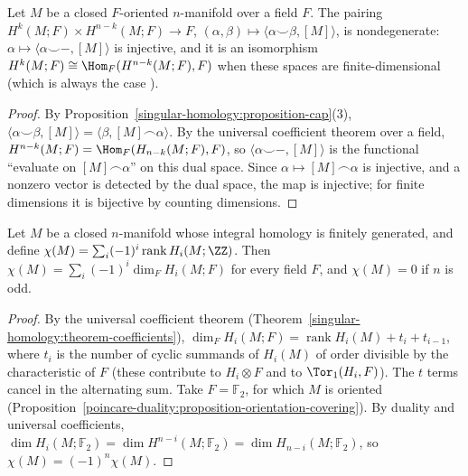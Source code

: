 \begin{corollary}\label{poincare-duality:corollary-cup-pairing}
Let $M$ be a closed $F$-oriented $n$-manifold over a field $F$. The pairing $H^k(M; F) \times H^{n-k}(M; F) \to F$, $(\alpha, \beta) \mapsto \langle \alpha \smile \beta, [M] \rangle$,
is nondegenerate: $\alpha \mapsto \langle \alpha \smile -, [M] \rangle$ is injective, and it is an isomorphism $H^k(M; F) \cong \Hom_F(H^{n-k}(M; F), F)$ when these spaces are
finite-dimensional (which is always the case \cite[Appendix]{hatcher-at}).
\end{corollary}

\begin{proof}
By Proposition~\ref{singular-homology:proposition-cap}(3), $\langle \alpha \smile \beta, [M] \rangle = \langle \beta, [M] \frown \alpha \rangle$. By the universal coefficient
theorem over a field, $H^{n-k}(M; F) = \Hom_F(H_{n-k}(M; F), F)$, so $\langle \alpha \smile -, [M] \rangle$ is the functional ``evaluate on $[M] \frown \alpha$'' on this dual space. Since
$\alpha \mapsto [M] \frown \alpha$ is injective, and a nonzero vector is detected by the dual space, the map is injective; for finite dimensions it is bijective by counting
dimensions.
\end{proof}

\begin{corollary}\label{poincare-duality:corollary-euler-odd}
Let $M$ be a closed $n$-manifold whose integral homology is finitely generated, and define $\chi(M) = \sum_i (-1)^i \operatorname{rank} H_i(M; \ZZ)$. Then
$\chi(M) = \sum_i(-1)^i\dim_F H_i(M; F)$ for every field $F$, and $\chi(M) = 0$ if $n$ is odd.
\end{corollary}

\begin{proof}
By the universal coefficient theorem (Theorem~\ref{singular-homology:theorem-coefficients}), $\dim_F H_i(M; F) = \operatorname{rank} H_i(M) + t_i + t_{i-1}$, where $t_i$ is the number of
cyclic summands of $H_i(M)$ of order divisible by the characteristic of $F$ (these contribute to $H_i \otimes F$ and to $\Tor_1(H_i, F)$). The $t$ terms cancel in the alternating
sum. Take $F = \mathbb{F}_2$, for which $M$ is oriented (Proposition~\ref{poincare-duality:proposition-orientation-covering}). By duality and universal coefficients,
$\dim H_i(M; \mathbb{F}_2) = \dim H^{n-i}(M; \mathbb{F}_2) = \dim H_{n-i}(M; \mathbb{F}_2)$, so $\chi(M) = (-1)^n\chi(M)$.
\end{proof}

